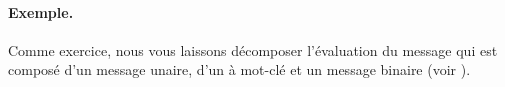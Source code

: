 \documentclass[a4paper,10pt,twoside]{book}
\begin{document}




\paragraph{Exemple.} Comme exercice, nous vous laissons d\'ecomposer l'\'evaluation du message  qui est compos\'e d'un message unaire, d'un \`a mot-cl\'e et un message binaire (voir ).

\end{document}
